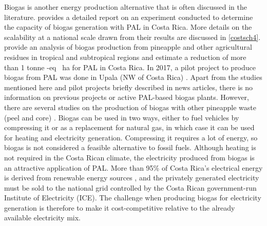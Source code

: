 Biogas is another energy production alternative that is often discussed in the literature. \cite{arce2014determinacion} provides a detailed report on an experiment conducted to determine the capacity of biogas generation with PAL in Costa Rica. More details on the scalability at a national scale drawn from their results are discussed in \cref{costsch4}. \cite{kohlmann2015, barz2019agricultural} provide an analysis of biogas production from pineapple and other agricultural residues in tropical and subtropical regions and estimate a reduction of more than 1 tonne -eq \si{\per\hectare} for PAL in Costa Rica. In 2017, a pilot project to produce biogas from PAL was done in Upala (NW of Costa Rica) \citep{iceValle}. Apart from the studies mentioned here and pilot projects briefly described in news articles, there is no information on previous projects or active PAL-based biogas plants. However, there are several studies on the production of biogas with other pineapple waste (peel and core) \cite{aili2021recent}. Biogas can be used in two ways, either to fuel vehicles by compressing it or as a replacement for natural gas, in which case it can be used for heating and electricity generation. Compressing it requires a lot of energy, so biogas is not considered a feasible alternative to fossil fuels. Although heating is not required in the Costa Rican climate, the electricity produced from biogas is an attractive application of PAL. More than 95\% of Costa Rica's electrical energy is derived from renewable energy sources \cite{iceEnergia}, and the privately generated electricity must be sold to the national grid controlled by the Costa Rican government-run Institute of Electricity (ICE). The challenge when producing biogas for electricity generation is therefore to make it cost-competitive relative to the already available electricity mix.
 

